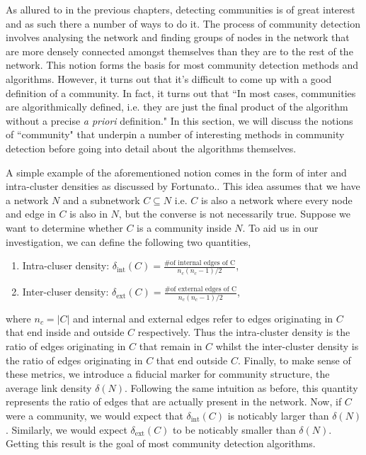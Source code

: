 As allured to in the previous chapters, detecting communities is of great interest and as such there a number of ways to do it. The process of community detection involves analysing the network and finding groups of nodes in the network that are more densely connected amongst themselves than they are to the rest of the network. This notion forms the basis for most community detection methods and algorithms. However, it turns out that it's difficult to come up with a good definition of a community. In fact, it turns out that ``In most cases, communities are algorithmically defined, i.e. they are just the final product of the algorithm without a precise \emph{a priori} definition."\cite[84]{fortunato} In this section, we will discuss the notions of ``community" that underpin a number of interesting methods in community detection before going into detail about the algorithms themselves.

A simple example of the aforementioned notion comes in the form of inter and intra-cluster densities as discussed by Fortunato.\cite[84]{fortunato}. This idea assumes that we have a network $N$ and a subnetwork $C \subseteq N$ i.e. $C$ is also a network where every node and edge in $C$ is also in $N$, but the converse is not necessarily true. Suppose we want to determine whether $C$ is a community inside $N$. To aid us in our investigation, we can define the following two quantities,

\begin{enumerate}
    \item Intra-cluser density: $\delta_{\text{int}}(C) = \frac{\text{\# of internal edges of C}}{n_c(n_c - 1)/2} $,
    \item Inter-cluser density: $\delta_{\text{ext}}(C) = \frac{\text{\# of external edges of C}}{n_c(n_c - 1)/2} $,
\end{enumerate}

where $n_c = |C|$ and internal and external edges refer to edges originating in $C$ that end inside and outside $C$ respectively. Thus the intra-cluster density is the ratio of edges originating in $C$ that remain in $C$ whilst the inter-cluster density is the ratio of edges originating in $C$ that end outside $C$. Finally, to make sense of these metrics, we introduce a fiducial marker for community structure, the average link density $\delta(N)$. Following the same intuition as before, this quantity represents the ratio of edges that are actually present in the network. Now, if $C$ were a community, we would expect that $\delta_{\text{int}}(C)$ is noticably larger than $\delta(N)$. Similarly, we would expect $\delta_{\text{ext}}(C)$ to be noticably smaller than $\delta(N)$. Getting this result is the goal of most community detection algorithms.

